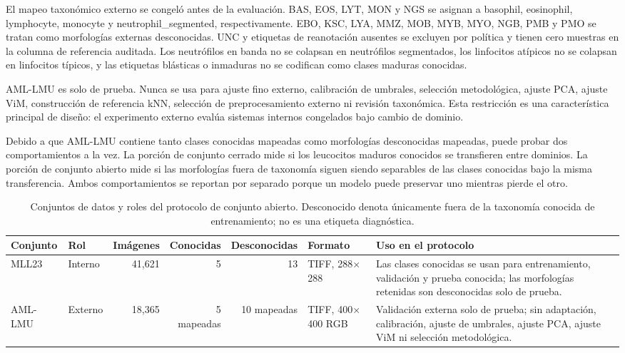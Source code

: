 \documentclass[11pt]{article}
\begin{document}
El mapeo taxonómico externo se congeló antes de la evaluación. BAS, EOS, LYT, MON y NGS se asignan a basophil, eosinophil, lymphocyte, monocyte y neutrophil\_segmented, respectivamente. EBO, KSC, LYA, MMZ, MOB, MYB, MYO, NGB, PMB y PMO se tratan como morfologías externas desconocidas. UNC y etiquetas de reanotación ausentes se excluyen por política y tienen cero muestras en la columna de referencia auditada. Los neutrófilos en banda no se colapsan en neutrófilos segmentados, los linfocitos atípicos no se colapsan en linfocitos típicos, y las etiquetas blásticas o inmaduras no se codifican como clases maduras conocidas.

AML-LMU es solo de prueba. Nunca se usa para ajuste fino externo, calibración de umbrales, selección metodológica, ajuste PCA, ajuste ViM, construcción de referencia kNN, selección de preprocesamiento externo ni revisión taxonómica. Esta restricción es una característica principal de diseño: el experimento externo evalúa sistemas internos congelados bajo cambio de dominio.

Debido a que AML-LMU contiene tanto clases conocidas mapeadas como morfologías desconocidas mapeadas, puede probar dos comportamientos a la vez. La porción de conjunto cerrado mide si los leucocitos maduros conocidos se transfieren entre dominios. La porción de conjunto abierto mide si las morfologías fuera de taxonomía siguen siendo separables de las clases conocidas bajo la misma transferencia. Ambos comportamientos se reportan por separado porque un modelo puede preservar uno mientras pierde el otro.

\begin{table}[htbp]
\centering
\small
\begin{tabularx}{\textwidth}{l l r r r l X}
\toprule
Conjunto & Rol & Imágenes & Conocidas & Desconocidas & Formato & Uso en el protocolo \\
\midrule
MLL23 & Interno & 41,621 & 5 & 13 & TIFF, 288$\times$288 & Las clases conocidas se usan para entrenamiento, validación y prueba conocida; las morfologías retenidas son desconocidas solo de prueba. \\
AML-LMU & Externo & 18,365 & 5 mapeadas & 10 mapeadas & TIFF, 400$\times$400 RGB & Validación externa solo de prueba; sin adaptación, calibración, ajuste de umbrales, ajuste PCA, ajuste ViM ni selección metodológica. \\
\bottomrule
\end{tabularx}
\caption{Conjuntos de datos y roles del protocolo de conjunto abierto. Desconocido denota únicamente fuera de la taxonomía conocida de entrenamiento; no es una etiqueta diagnóstica.}
\label{tab:datasets}
\end{table}
\end{document}
